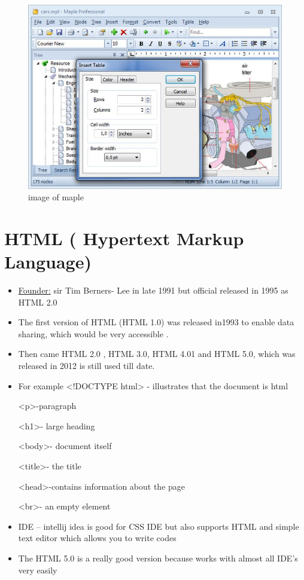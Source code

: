 \documentclass{article}
\begin{document}
\begin{figure}
	\centering
	\includegraphics[width=\linewidth]{"Maple-3-BIG (1).jpg"}
	\caption{image of maple}
	\label{fig:maple-3-big-1}
\end{figure}

  \newpage
  \section{ HTML ( Hypertext Markup Language)}
 
 
\begin{itemize}
	\item\underline{Founder:}  sir Tim Berners- Lee in late 1991 but official released in 1995 as HTML 2.0
	
	\item The first version of HTML (HTML 1.0) was released in1993 to enable data sharing, which would be very accessible  .
	
	\item Then came HTML 2.0 , HTML 3.0, HTML 4.01 and HTML 5.0, which was released in 2012 is still used till date.
	\item For  example 
	<!DOCTYPE html> - illustrates that the document is html
	
	<p>-paragraph
	
	<h1>- large heading
	
	<body>- document itself
	
	<title>- the title
	
	<head>-contains information about the page
	
	<br>- an empty element	
	\item IDE – intellij idea is good for CSS IDE but also supports HTML and simple text editor which allows you to write codes
	
	\item The HTML 5.0 is a really good version because works with almost all IDE’s very easily
	\end{itemize}
	\newpage
	
\end{document}
